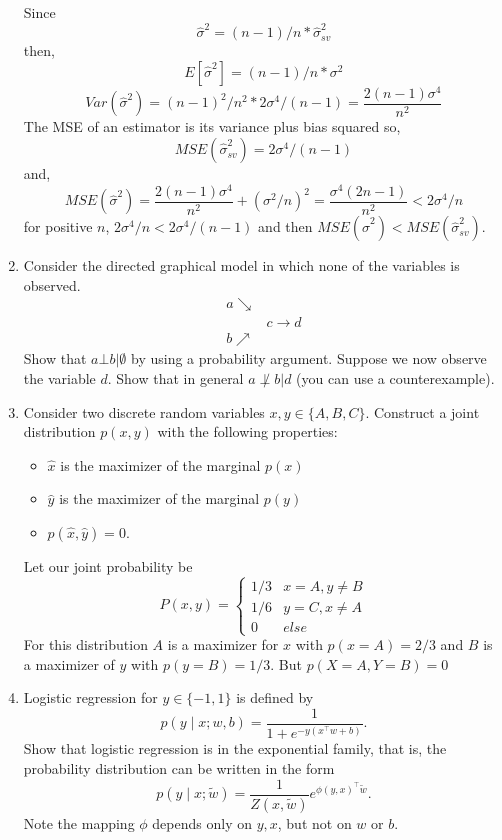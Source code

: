 \documentclass{article}
\begin{document}
\begin{enumerate}
Since $$\hat\sigma ^2 = (n-1)/n * \hat\sigma^2_{sv}$$
then,
$$
E[\hat\sigma^2] = (n-1)/n * \sigma^2
$$
$$
Var(\hat\sigma^2) = (n-1)^2/n^2 * 2\sigma^4/(n-1) = \frac{2(n-1)\sigma^4}{n^2}
$$
The MSE of an estimator is its variance plus bias squared so,
$$
MSE(\hat\sigma^2_{sv}) = 2\sigma^4/(n-1)
$$
and,
$$
MSE(\hat\sigma^2) = \frac{2(n-1)\sigma^4}{n^2} + (\sigma^2/n)^2 = \frac{\sigma^4 (2n-1)}{n^2} < 2\sigma^4 / n
$$
for positive $n$, $2\sigma^4/n < 2\sigma^4 / (n-1)$
and then
$MSE(\hat\sigma^2) < MSE(\hat\sigma^2_{sv})$.  

\color{black}

\item
Consider the directed graphical model in which none of the variables is observed.  
$$
\begin{array}{cc}
a \searrow &  \\
& c \rightarrow d \\
b \nearrow &
\end{array}
$$
Show that $a \bot b \vert \emptyset$ by using a probability argument.
Suppose we now observe the variable $d$.  Show that in general $a \not\perp b \vert d$ (you can use a counterexample).

\item
Consider two discrete random variables $x,y \in \{A,B,C\}$.
Construct a joint distribution $p(x,y)$ with the following properties:
\begin{itemize}
\item $\hat x$ is the maximizer of the marginal $p(x)$
\item $\hat y$ is the maximizer of the marginal $p(y)$
\item $p(\hat x, \hat y)=0$.
\end{itemize}
\color{blue}
Let our joint probability be 
$$
P(x,y) = 
\begin{cases}
1/3 & x = A, y \neq B \\
1/6 & y = C, x \neq A \\
0 & else
\end{cases}
$$
For this distribution $A$ is a maximizer for $x$ with $p(x = A) = 2/3$ and $B$ is a maximizer of $y$ with $p(y = B) = 1/3$. 
But $p(X = A, Y = B) = 0$
\color{black}

\item
Logistic regression for $y\in \{-1,1\}$ is defined by
$$p(y \mid x; w,b) = \frac{1}{1+e^{-y (x^\top w + b)}}.$$
Show that logistic regression is in the exponential family, that is, the probability distribution can be written in the form
$$p(y \mid x; \tilde w) = \frac{1}{Z(x,\tilde w)} e^{\phi(y,x)^\top \tilde w}.$$
Note the mapping $\phi$ depends only on $y, x$, but not on $w$ or $b$.


\end{enumerate}
\end{document}
